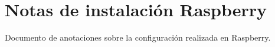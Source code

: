 
\chapter{Notas de instalación Raspberry} %

\label{app:raspi-tips} %

Documento de anotaciones sobre la configuración realizada en Raspberry.

\newpage


